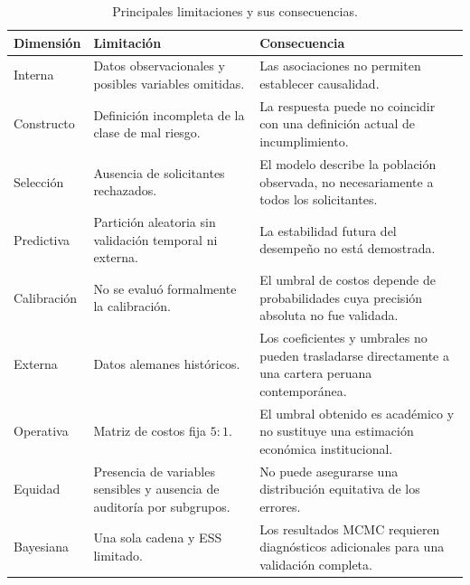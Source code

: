 \begin{table}[H]
    \centering
    \caption{Principales limitaciones y sus consecuencias.}
    \label{tab:resumen-limitaciones}

    \small
    \begin{tabularx}{\textwidth}{
        @{}
        >{\raggedright\arraybackslash}p{2.8cm}
        >{\raggedright\arraybackslash}p{4.3cm}
        X
        @{}
    }
        \toprule
        Dimensión
        & Limitación
        & Consecuencia \\
        \midrule

        Interna
        & Datos observacionales y posibles variables omitidas.
        & Las asociaciones no permiten establecer causalidad. \\

        Constructo
        & Definición incompleta de la clase de mal riesgo.
        & La respuesta puede no coincidir con una definición actual de
          incumplimiento. \\

        Selección
        & Ausencia de solicitantes rechazados.
        & El modelo describe la población observada, no necesariamente
          a todos los solicitantes. \\

        Predictiva
        & Partición aleatoria sin validación temporal ni externa.
        & La estabilidad futura del desempeño no está demostrada. \\

        Calibración
        & No se evaluó formalmente la calibración.
        & El umbral de costos depende de probabilidades cuya precisión
          absoluta no fue validada. \\

        Externa
        & Datos alemanes históricos.
        & Los coeficientes y umbrales no pueden trasladarse directamente
          a una cartera peruana contemporánea. \\

        Operativa
        & Matriz de costos fija \(5:1\).
        & El umbral obtenido es académico y no sustituye una estimación
          económica institucional. \\

        Equidad
        & Presencia de variables sensibles y ausencia de auditoría por
          subgrupos.
        & No puede asegurarse una distribución equitativa de los errores. \\

        Bayesiana
        & Una sola cadena y ESS limitado.
        & Los resultados MCMC requieren diagnósticos adicionales para una
          validación completa. \\

        \bottomrule
    \end{tabularx}
\end{table}

